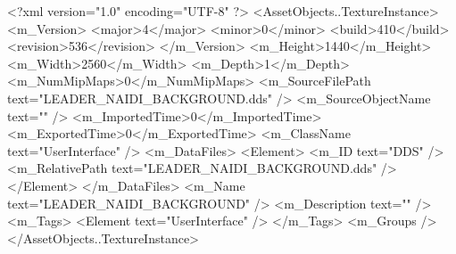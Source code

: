 <?xml version="1.0" encoding="UTF-8" ?>
<AssetObjects..TextureInstance>
	<m_Version>
		<major>4</major>
		<minor>0</minor>
		<build>410</build>
		<revision>536</revision>
	</m_Version>
	<m_Height>1440</m_Height>
	<m_Width>2560</m_Width>
	<m_Depth>1</m_Depth>
	<m_NumMipMaps>0</m_NumMipMaps>
	<m_SourceFilePath text="LEADER_NAIDI_BACKGROUND.dds" />
	<m_SourceObjectName text="" />
	<m_ImportedTime>0</m_ImportedTime>
	<m_ExportedTime>0</m_ExportedTime>
	<m_ClassName text="UserInterface" />
	<m_DataFiles>
		<Element>
			<m_ID text="DDS" />
			<m_RelativePath text="LEADER_NAIDI_BACKGROUND.dds" />
		</Element>
	</m_DataFiles>
	<m_Name text="LEADER_NAIDI_BACKGROUND" />
	<m_Description text="" />
	<m_Tags>
		<Element text="UserInterface" />
	</m_Tags>
	<m_Groups />
</AssetObjects..TextureInstance>
